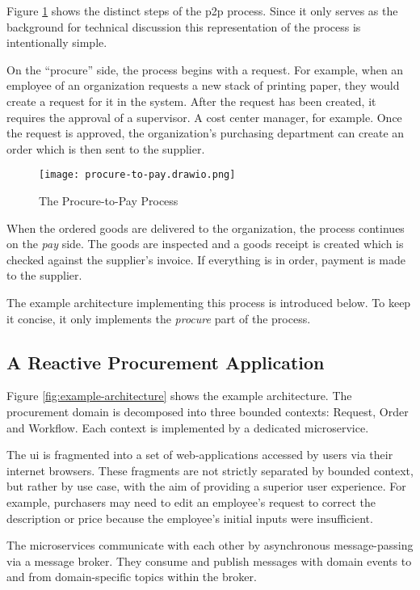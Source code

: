 Figure \ref{fig:procure-to-pay} shows the distinct steps of the \gls{p2p} process.
Since it only serves as the background for technical discussion this representation of the process is intentionally simple.

On the \enquote{procure} side, the process begins with a request.
For example, when an employee of an organization requests a new stack of printing paper, they would create a request for it in the system.
After the request has been created, it requires the approval of a supervisor.
A cost center manager, for example.
Once the request is approved, the organization's purchasing department can create an order which is then sent to the supplier.

\begin{figure}[h]
  \centering
  \texttt{[image: procure-to-pay.drawio.png]}
  \caption{The Procure-to-Pay Process}\label{fig:procure-to-pay}
\end{figure}

When the ordered goods are delivered to the organization, the process continues on the \emph{pay} side.
The goods are inspected and a goods receipt is created which is checked against the supplier's invoice.
If everything is in order, payment is made to the supplier.

The example architecture implementing this process is introduced below.
To keep it concise, it only implements the \emph{procure} part of the process.

\subsection{A Reactive Procurement Application}

Figure \ref{fig:example-architecture} shows the example architecture.
The procurement domain is decomposed into three bounded contexts: Request, Order and Workflow.
Each context is implemented by a dedicated microservice.

The \gls{ui} is fragmented into a set of web-applications accessed by users via their internet browsers.
These fragments are not strictly separated by bounded context, but rather by use case, with the aim of providing a superior user experience.
For example, purchasers may need to edit an employee's request to correct the description or price because the employee's initial inputs were insufficient.

The microservices communicate with each other by asynchronous message-passing via a message broker.
They consume and publish messages with domain events to and from domain-specific topics within the broker.

